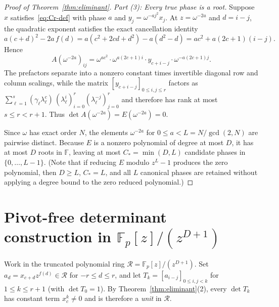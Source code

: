 \documentclass[11pt,reqno]{amsart}
\numberwithin{equation}{section}
\theoremstyle{definition}
\theoremstyle{remark}
\newcommand{\F}{\mathbb{F}}
\begin{document}
\begin{proof}[Proof of Theorem~\ref{thm:eliminant}]
\smallskip
\noindent\emph{Part (3): Every true phase is a root.} Suppose $x$ satisfies~\eqref{eq:Cr-def} with phase $a$ and $y_j = \omega^{-aj^2}x_j$. At $z = \omega^{-2a}$ and $d = i - j$, the quadratic exponent satisfies the exact cancellation identity
\begin{equation}
\label{eq:chirp-cancel}
a(c + d)^2 - 2a\,f(d) = a(c^2 + 2cd + d^2) - a(d^2 - d) = ac^2 + a(2c+1)(i - j).
\end{equation}
Hence
\[
A(\omega^{-2a})_{ij} = \omega^{ac^2}\cdot \omega^{a(2c+1)i}\cdot y_{c+i-j}\cdot \omega^{-a(2c+1)j}.
\]
The prefactors separate into a nonzero constant times invertible diagonal row and column scalings, while the matrix $[y_{c+i-j}]_{0\le i,j\le r}$ factors as $\sum_{\ell=1}^s (\gamma_\ell\lambda_\ell^c)\,(\lambda_\ell^i)_{i=0}^r (\lambda_\ell^{-j})_{j=0}^r$ and therefore has rank at most $s\le r < r+1$. Thus $\det A(\omega^{-2a}) = E(\omega^{-2a}) = 0$.

Since $\omega$ has exact order $N$, the elements $\omega^{-2a}$ for $0\le a < L = N/\gcd(2,N)$ are pairwise distinct. Because $E$ is a nonzero polynomial of degree at most $D$, it has at most $D$ roots in $\F$, leaving at most $C_* = \min(D,L)$ candidate phases in $\{0,\ldots,L-1\}$. (Note that if reducing $E$ modulo $z^L - 1$ produces the zero polynomial, then $D\ge L$, $C_*=L$, and all $L$ canonical phases are retained without applying a degree bound to the zero reduced polynomial.)
\end{proof}

\section{Pivot-free determinant construction in $\F_p[z]/(z^{D+1})$}
\label{sec:levinson}

Work in the truncated polynomial ring $\mathcal{R} = \F_p[z]/(z^{D+1})$. Set $a_d = x_{c+d} z^{f(d)}\in\mathcal{R}$ for $-r\le d\le r$, and let $T_k = [a_{i-j}]_{0\le i,j<k}$ for $1\le k\le r+1$ (with $\det T_0 = 1$). By Theorem~\ref{thm:eliminant}(2), every $\det T_k$ has constant term $x_c^k\neq 0$ and is therefore a \emph{unit} in $\mathcal{R}$.
\end{document}

